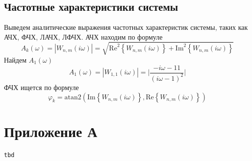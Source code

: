 \documentclass[a4paper, 12pt]{article}
\begin{document}
    \subsection{Частотные характеристики системы}
    Выведем аналитические выражения частотных характеристик системы,
    таких как АЧХ, ФЧХ, ЛАЧХ, ЛФЧХ. АЧХ находим по формуле
    $$
    A_k(\omega)=|W_{n,m}(i\omega)|=\sqrt{\text{Re}^2\left\{ W_{n,m}(i\omega)\right\}+\text{Im}^2\left\{ W_{n,m}(i\omega) \right\}}
    $$
    Найдем $A_1(\omega)$
    $$
    A_1\left( \omega \right)=|W_{1,1}(i\omega)|=\bigg|\dfrac{-i\omega-11}{(i\omega-1)^2}\bigg|
    $$
    ФЧХ ищется по формуле
    $$
    \varphi_k=\text{atan2}\left( \text{Im}\left\{ W_{n,m}(i\omega) \right\}, \text{Re}\left\{ W_{n,m}(i\omega)\right\}\right)
    $$


    \section{Приложение А}
    \begin{lstlisting}[label=task1, caption={Программа для задания 1}]
        tbd
    \end{lstlisting}
\end{document}
